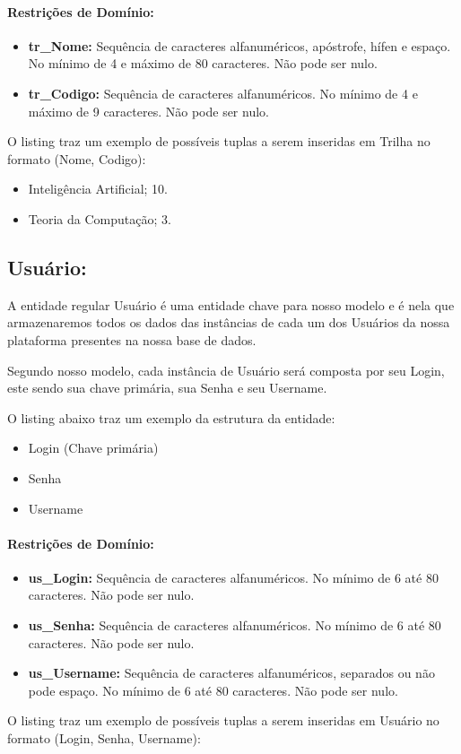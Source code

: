 \documentclass{report}
\begin{document}
\paragraph{Restrições de Domínio:}
\begin{itemize}
  \item \textbf{tr\_Nome:} Sequência de caracteres alfanuméricos, apóstrofe, hífen e espaço. No mínimo de 4 e máximo de 80 caracteres. Não pode ser nulo.
  \item \textbf{tr\_Codigo:} Sequência de caracteres alfanuméricos. No mínimo de 4 e máximo de 9 caracteres. Não pode ser nulo.
\end{itemize}
O listing traz um exemplo de possíveis tuplas a serem inseridas em Trilha no formato (Nome, Codigo):

\begin{itemize}
	\item Inteligência Artificial; 10. 
	\item Teoria da Computação; 3.
\end{itemize}
\subsection{Usuário:}
 	A entidade regular Usuário é uma entidade chave para nosso modelo e é nela que armazenaremos todos os dados das instâncias de cada um dos Usuários da nossa plataforma presentes na nossa base de dados.
	
	Segundo nosso modelo, cada instância de Usuário será composta por seu Login, este sendo sua chave primária, sua Senha e seu Username.
		
	O listing abaixo traz um exemplo da estrutura da entidade:
\begin{itemize}
  \item Login (Chave primária)
  \item Senha
  \item Username
\end{itemize}
\paragraph{Restrições de Domínio:}
\begin{itemize}
  \item \textbf{us\_Login:} Sequência de caracteres alfanuméricos. No mínimo de 6 até 80 caracteres. Não pode ser nulo.
  \item \textbf{us\_Senha:}  Sequência de caracteres alfanuméricos. No mínimo de 6 até 80 caracteres. Não pode ser nulo.
  \item \textbf{us\_Username:} Sequência de caracteres alfanuméricos, separados ou não pode espaço. No mínimo de 6 até 80 caracteres. Não pode ser nulo.
\end{itemize}
O listing traz um exemplo de possíveis tuplas a serem inseridas em Usuário no formato (Login, Senha, Username):
\end{document}
